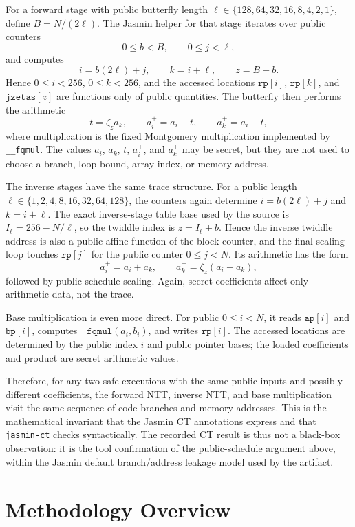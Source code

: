 \documentclass[10pt,twocolumn]{article}
\begin{document}
For a forward stage with public butterfly length
\(\ell\in\{128,64,32,16,8,4,2,1\}\), define \(B=N/(2\ell)\).  The Jasmin
helper for that stage iterates over public counters
\[
  0\le b < B,
  \qquad 0\le j < \ell,
\]
and computes
\[
  i=b(2\ell)+j,
  \qquad k=i+\ell,
  \qquad z=B+b.
\]
Hence \(0\le i<256\), \(0\le k<256\), and the accessed locations
\(\texttt{rp}[i]\), \(\texttt{rp}[k]\), and \(\texttt{jzetas}[z]\) are functions
only of public quantities.  The butterfly then performs the arithmetic
\[
  t = \zeta_z a_k,
  \qquad a_i^{+} = a_i + t,
  \qquad a_k^{+} = a_i - t,
\]
where multiplication is the fixed Montgomery multiplication implemented by
\texttt{\_\_fqmul}.  The values \(a_i\), \(a_k\), \(t\), \(a_i^{+}\), and
\(a_k^{+}\) may be secret, but they are not used to choose a branch, loop
bound, array index, or memory address.

The inverse stages have the same trace structure.  For a public length
\(\ell\in\{1,2,4,8,16,32,64,128\}\), the counters again determine
\(i=b(2\ell)+j\) and \(k=i+\ell\).  The exact inverse-stage table base used
by the source is \(I_\ell=256-N/\ell\), so the twiddle index is
\(z=I_\ell+b\).  Hence the inverse twiddle address is also a public
affine function of the block counter, and the final scaling loop touches
\(\texttt{rp}[j]\) for the public counter \(0\le j<N\).  Its arithmetic has the
form
\[
  a_i^{+} = a_i + a_k,
  \qquad a_k^{+} = \zeta_z(a_i-a_k),
\]
followed by public-schedule scaling.  Again, secret coefficients affect only
arithmetic data, not the trace.

Base multiplication is even more direct.  For public \(0\le i<N\), it reads
\(\texttt{ap}[i]\) and \(\texttt{bp}[i]\), computes
\(\texttt{\_\_fqmul}(a_i,b_i)\), and writes \(\texttt{rp}[i]\).  The accessed
locations are determined by the public index \(i\) and public pointer bases;
the loaded coefficients and product are secret arithmetic values.

Therefore, for any two safe executions with the same public inputs and possibly
different coefficients, the forward NTT, inverse NTT, and base multiplication
visit the same sequence of code branches and memory addresses.  This is the
mathematical invariant that the Jasmin CT annotations express and that
\texttt{jasmin-ct} checks syntactically.  The recorded CT result is thus not a
black-box observation: it is the tool confirmation of the public-schedule
argument above, within the Jasmin default branch/address leakage model used by
the artifact.

\section{Methodology Overview}
\end{document}
